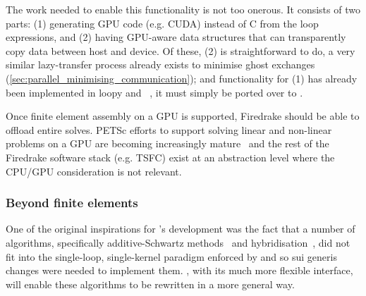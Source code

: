 \documentclass[thesis]{subfiles}
\begin{document}
The work needed to enable this functionality is not too onerous.
It consists of two parts:
(1) generating GPU code (e.g. CUDA) instead of C from the loop expressions, and
(2) having GPU-aware data structures that can transparently copy data between host and device.
Of these, (2) is straightforward to do, a very similar lazy-transfer process already exists to minimise ghost exchanges (\cref{sec:parallel_minimising_communication}); and functionality for (1) has already been implemented in loopy and ~\cite{fenics2021-kulkarni}, it must simply be ported over to .

Once finite element assembly on a GPU is supported, Firedrake should be able to offload entire solves.
PETSc efforts to support solving linear and non-linear problems on a GPU are becoming increasingly mature~\cite{millsPerformancePortablePETScGPUbased2020,millsPETScTAODevelopments2024}
and the rest of the Firedrake software stack (e.g. TSFC) exist at an abstraction level where the CPU/GPU consideration is not relevant.

\subsubsection{Beyond finite elements}
\label{sec:more_stencils}

One of the original inspirations for 's development was the fact that a number of algorithms, specifically additive-Schwartz methods~\cite{farrellPCPATCHSoftwareTopological2021} and hybridisation~\cite{gibsonSlateExtendingFiredrake2020}, did not fit into the single-loop, single-kernel paradigm enforced by  and so sui generis changes were needed to implement them.
, with its much more flexible interface, will enable these algorithms to be rewritten in a more general way.
\end{document}
